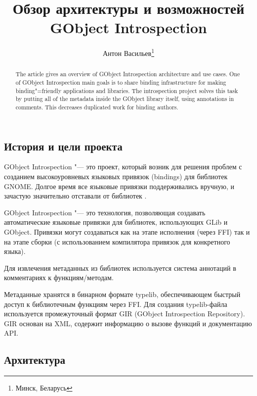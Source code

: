 \documentclass[10pt, a5paper]{article}
\begin{document}
\title{Обзор архитектуры и возможностей GObject Introspection}%

\author{Антон Васильев\footnote{Минск, Беларусь}}
\maketitle

\begin{abstract}
The article gives an overview of GObject Introspection architecture and use cases.
One of GObject Introspection main goals is to share binding infrastructure for making binding"=friendly applications and libraries.
The introspection project solves this task by putting all of the metadata
inside the GObject library itself, using annotations in comments.
This decreases duplicated work for binding authors.
\end{abstract}

\subsection*{История и цели проекта}

GObject Introspection "--- это проект, который возник для решения проблем
с созданием высокоуровневых языковых привязок (bindings) для библиотек GNOME. Долгое время все языковые привязки поддерживались вручную, и зачастую значительно отставали от библиотек \cite{Antono1}.

GObject Introspection "--- это технология, позволяющая создавать
автоматические языковые привязки для библиотек, использующих GLib и
GObject.  Привязки могут создаваться как на этапе исполнения (через
FFI) так и на этапе сборки (с использованием компилятора привязок для
конкретного языка).

Для извлечения метаданных из библиотек используется система аннотаций в комментариях к функциям/методам.

Метаданные хранятся в бинарном формате typelib, обеспечивающем
быстрый доступ к библиотечным функциям через FFI. Для создания typelib-файла используется промежуточный формат GIR (GObject Introspection
Repository). GIR основан на XML, содержит информацию о вызове
функций и документацию API.

\subsection*{Архитектура}
\end{document}
